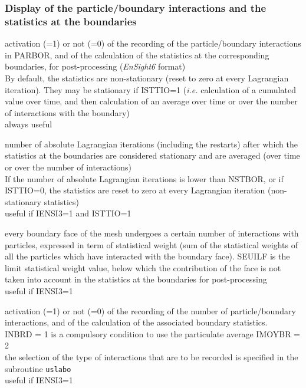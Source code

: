 \subsubsection{Display of the particle/boundary interactions and the statistics at the boundaries}

{activation (=1) or not (=0) of the recording of the particle/boundary
interactions in  PARBOR, and of the calculation of the
statistics at the corresponding boundaries, for post-processing
(\textit{EnSight6} format)\\
By default, the statistics are non-stationary (reset to zero at every
Lagrangian iteration). They may be stationary if ISTTIO=1 ({\em i.e.}
calculation of a cumulated value over time, and then calculation of an
average over time or over the number of interactions with the boundary)\\
always useful}

{number of absolute Lagrangian iterations (including the restarts)
after which the statistics at the boundaries are considered stationary and are
averaged (over time or over the number of interactions)\\
If the number of absolute Lagrangian iterations is lower than NSTBOR, or if
ISTTIO=0, the statistics are reset to zero at every Lagrangian iteration
(non-stationary statistics)\\
useful if IENSI3=1 and ISTTIO=1}

{every boundary face of the mesh undergoes a certain number of
interactions with particles, expressed in term of statistical weight
(sum of the statistical weights of all the particles which have
interacted with the boundary face). SEUILF is
the limit statistical weight value, below which the contribution of the
face is not taken into account in the
statistics at the boundaries for post-processing\\ 
useful if IENSI3=1}

{activation (=1) or not (=0) of the recording of the number of particle/boundary
interactions, and of the calculation of the associated boundary statistics.\\
INBRD = 1 is a compulsory condition to use the particulate average
IMOYBR = 2\\
the selection of the type of interactions that are to be recorded is specified
in the subroutine \texttt{uslabo}\\
useful if IENSI3=1}

